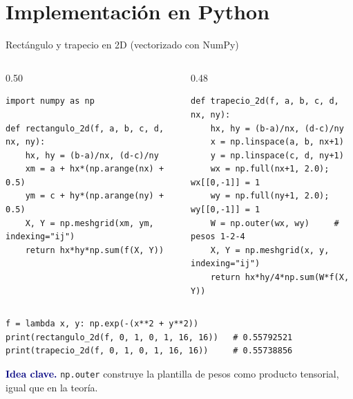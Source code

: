 \documentclass[aspectratio=169,10pt]{beamer}
\newcommand{\ideaclave}[1]{\begin{clave}\small\textbf{\textcolor{navy}{Idea clave.}} #1\end{clave}}
\begin{document}
\section{Implementaci\'on en Python}
\begin{frame}[fragile]{Rect\'angulo y trapecio en 2D (vectorizado con NumPy)}
\begin{columns}[T]
\begin{column}{0.50\textwidth}
\begin{lstlisting}
import numpy as np

def rectangulo_2d(f, a, b, c, d, nx, ny):
    hx, hy = (b-a)/nx, (d-c)/ny
    xm = a + hx*(np.arange(nx) + 0.5)
    ym = c + hy*(np.arange(ny) + 0.5)
    X, Y = np.meshgrid(xm, ym, indexing="ij")
    return hx*hy*np.sum(f(X, Y))
\end{lstlisting}
\end{column}
\begin{column}{0.48\textwidth}
\begin{lstlisting}
def trapecio_2d(f, a, b, c, d, nx, ny):
    hx, hy = (b-a)/nx, (d-c)/ny
    x = np.linspace(a, b, nx+1)
    y = np.linspace(c, d, ny+1)
    wx = np.full(nx+1, 2.0); wx[[0,-1]] = 1
    wy = np.full(ny+1, 2.0); wy[[0,-1]] = 1
    W = np.outer(wx, wy)     # pesos 1-2-4
    X, Y = np.meshgrid(x, y, indexing="ij")
    return hx*hy/4*np.sum(W*f(X, Y))
\end{lstlisting}
\end{column}
\end{columns}
\smallskip
\begin{lstlisting}
f = lambda x, y: np.exp(-(x**2 + y**2))
print(rectangulo_2d(f, 0, 1, 0, 1, 16, 16))   # 0.55792521
print(trapecio_2d(f, 0, 1, 0, 1, 16, 16))     # 0.55738856
\end{lstlisting}
\ideaclave{\texttt{np.outer} construye la plantilla de pesos como \alert{producto tensorial}, igual que en la teor\'ia.}
\end{frame}
\end{document}

